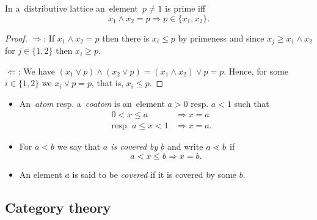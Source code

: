 \begin{lem} \label{lem:primeness-equiv}
  In a~distributive lattice an~element~$p \ne 1$ is prime iff 
  \[
    x_1 \wedge x_2 = p \Rightarrow p\in \{ x_1, x_2 \}.
  \]
\end{lem}
\begin{proof}
  $\Rightarrow$:
  If $x_1 \wedge x_2 = p$ then there is $x_i \le p$ by primeness and since $x_j
  \ge x_1 \wedge x_2$ for $j\in \{ 1, 2 \}$ then $x_i \ge p$.

  $\Leftarrow$:
  We have $(x_1 \vee p) \wedge (x_2 \vee p) = (x_1 \wedge x_2) \vee p = p$.
  Hence, for some $i\in \{ 1, 2 \}$ we $x_i \vee p = p$, that is, $x_i \le p$.
\end{proof}

\begin{itemize}
\item An~\emph{atom\/} resp. a~\emph{coatom\/} is an~element $a > 0$ resp. $a <
1$ such that
\begin{align*}
  0 < x \le a &\Rightarrow x = a ~~~~~~\\
  \text{resp. } a \le x < 1 &\Rightarrow x = a.
\end{align*}

\item For $a < b$ we say that \emph{$a$ is covered by $b$\/} and write $a <\mkern-12mu\cdot\mkern8mu
b$ if
\[
  a < x \le b \Rightarrow x = b.
\]

\item An element $a$ is said to be \emph{covered\/} if it is covered by some
$b$.

\end{itemize}

\subsection*{Category theory}

